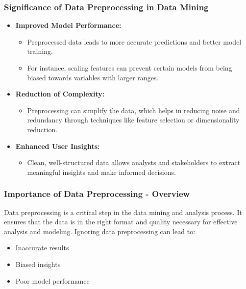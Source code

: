 \documentclass{beamer}
\begin{document}
\begin{frame}[fragile]
    \frametitle{Significance of Data Preprocessing in Data Mining}
    \begin{itemize}
        \item \textbf{Improved Model Performance:}
        \begin{itemize}
            \item Preprocessed data leads to more accurate predictions and better model training.
            \item For instance, scaling features can prevent certain models from being biased towards variables with larger ranges.
        \end{itemize}

        \item \textbf{Reduction of Complexity:}
        \begin{itemize}
            \item Preprocessing can simplify the data, which helps in reducing noise and redundancy through techniques like feature selection or dimensionality reduction.
        \end{itemize}

        \item \textbf{Enhanced User Insights:}
        \begin{itemize}
            \item Clean, well-structured data allows analysts and stakeholders to extract meaningful insights and make informed decisions.
        \end{itemize}
    \end{itemize}
\end{frame}

\begin{frame}[fragile]
    \frametitle{Importance of Data Preprocessing - Overview}
    Data preprocessing is a critical step in the data mining and analysis process. 
    It ensures that the data is in the right format and quality necessary for effective analysis and modeling. 
    Ignoring data preprocessing can lead to:
    \begin{itemize}
        \item Inaccurate results
        \item Biased insights
        \item Poor model performance
    \end{itemize}
\end{frame}
\end{document}
